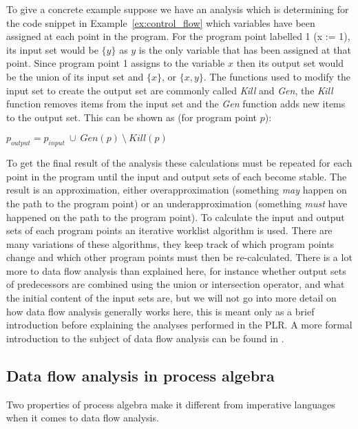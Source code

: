 	To give a concrete example suppose we have an analysis which is determining 
	for the code snippet in Example~\ref{ex:control_flow} which variables have 
	been assigned at each point in the program. For the program point labelled 1 
	(x := 1), its input set would be $\{y\}$ as $y$ is the only variable that 
	has been assigned at that point. Since program point 1 assigns to the 
	variable $x$ then its output set would be the union of its input set and 
	$\{x\}$, or $\{x,y\}$. The functions used to modify the input set to create 
	the output set are commonly called \textit{Kill} and \textit{Gen}, the 
	\textit{Kill} function removes items from the input set and the \textit{Gen} 
	function adds new items to the output set. This can be shown as (for program 
	point $p$):
	
	\begin{center}
	$p_{output} = p_{input}\ \cup\ Gen(p)\ \setminus\ Kill(p) $
	\end{center}
	
	To get the final result of the analysis these calculations must be repeated 
	for each point in the program until the input and output sets of each become 
	stable. The result is an approximation, either overapproximation (something 
	\textit{may} happen on the path to the program point) or an underapproximation
	(something \textit{must} have happened on the path to the program point).  To 
	calculate the input and output sets of each program points an iterative 
	worklist algorithm is used. There are many variations of these algorithms, 
	they keep track of which program points change and which other program points 
	must then be re-calculated. There is a lot more to data flow analysis than 
	explained here, for instance whether output sets of predecessors are combined 
	using the union or intersection operator, and what the initial content of the 
	input sets are, but we will not go into more detail on how data flow analysis 
	generally works here, this is meant only as a brief introduction before 
	explaining the analyses performed in the PLR. A more formal introduction to 
	the subject of data flow analysis can be found in \cite{program_analysis}.
	
	\subsection{Data flow analysis in process algebra}
	
	Two properties of process algebra make it different from imperative 	
	languages when it comes to data flow analysis.
	
